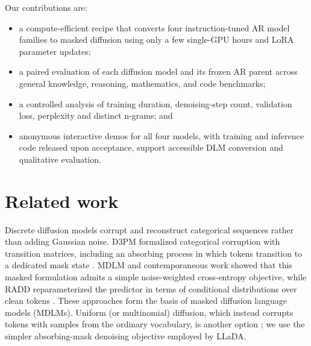 \documentclass{article}
\begin{document}
Our contributions are:
\begin{itemize}
    \item a compute-efficient recipe that converts four instruction-tuned AR model families to masked diffusion using only a few single-GPU hours and LoRA parameter updates;
    \item a paired evaluation of each diffusion model and its frozen AR parent across general knowledge, reasoning, mathematics, and code benchmarks;
    \item a controlled analysis of training duration, denoising-step count, validation loss, perplexity and distinct n-grams; and
    \item anonymous interactive demos for all four models, with training and inference code released upon acceptance, support accessible DLM conversion and qualitative evaluation.
\end{itemize}

\section{Related work}

Discrete diffusion models corrupt and reconstruct categorical sequences rather than adding Gaussian noise. D3PM formalized categorical corruption with transition matrices, including an absorbing process in which tokens transition to a dedicated mask state \citep{austin2021structured}. MDLM and contemporaneous work showed that this masked formulation admits a simple noise-weighted cross-entropy objective, while RADD reparameterized the predictor in terms of conditional distributions over clean tokens \citep{sahoo2024simple,shi2024simplified,ou2024absorbing}. These approaches form the basis of masked diffusion language models (MDLMs). Uniform (or multinomial) diffusion, which instead corrupts tokens with samples from the ordinary vocabulary, is another option \citep{hoogeboom2021multinomial}; we use the simpler absorbing-mask denoising objective employed by LLaDA.
\end{document}
